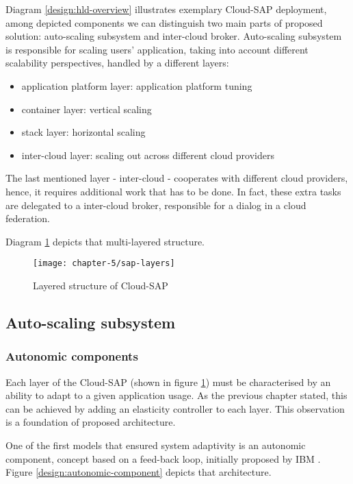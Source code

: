 Diagram \ref{design:hld-overview} illustrates exemplary Cloud-SAP deployment, among depicted components we can distinguish two main parts of proposed solution: auto-scaling subsystem and inter-cloud broker. Auto-scaling subsystem is responsible for scaling users' application, taking into account different scalability perspectives, handled by a different layers:
\begin{itemize}
	\item application platform layer: application platform tuning
	\item container layer: vertical scaling
	\item stack layer: horizontal scaling
	\item inter-cloud layer: scaling out across different cloud providers
\end{itemize}
The last mentioned layer - inter-cloud - cooperates with different cloud providers, hence, it requires additional work that has to be done. In fact, these extra tasks are delegated to a inter-cloud broker, responsible for a dialog in a cloud federation.

Diagram \ref{design:csap-layers} depicts that multi-layered structure.

\begin{figure}[!ht]
  \begin{center}
    \texttt{[image: chapter-5/sap-layers]}
  \end{center}
  \caption{Layered structure of Cloud-SAP}
  \label{design:csap-layers}
\end{figure}

\subsection{Auto-scaling subsystem}

\subsubsection{Autonomic components}
Each layer of the Cloud-SAP (shown in figure \ref{design:csap-layers}) must be characterised by an ability to adapt to a given application usage. As the previous chapter stated, this can be achieved by adding an elasticity controller to each layer. This observation is a foundation of proposed architecture.

One of the first models that ensured system adaptivity is an autonomic component, concept based on a feed-back loop, initially proposed by IBM \cite{IBM06}. Figure \ref{design:autonomic-component} depicts that architecture. 

